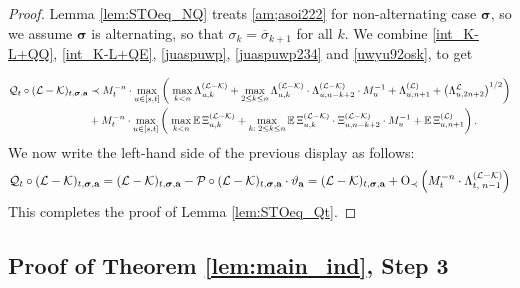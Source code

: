 \begin{proof}
Lemma \ref{lem:STOeq_NQ} treats \eqref{am;asoi222} for non-alternating case $\boldsymbol{\sigma}$, so we assume $\boldsymbol{\sigma}$ is alternating, so that $\sigma_{k}=\overline{\sigma}_{k+1}$ for all $k$. We combine \eqref{int_K-L+QQ}, \eqref{int_K-L+QE}, \eqref{juaspuwp}, \eqref{juaspuwp234} and \eqref{uwyu92osk},  to get

\begin{align}
    {\cal Q}_t\circ   (\mathcal{L} - \mathcal{K})_{t, \boldsymbol{\sigma}, \textbf{a}} &\prec M^{-n}_t\cdot \max_{u\in[s,t]} \left(\; \max_{k<n }\Lambda^{({\cal L-\cal K})}_{u,k}+\max_{2\le k\le n }\Lambda^{({\cal L-\cal K})}_{u,k}\cdot \Lambda^{({\cal L-\cal K})}_{u,n-k+2}\cdot M_{u}^{-1}+\Lambda^{({\cal L})}_{u,n+1}+\left(\Lambda^{\cal L}_{u,2n+2}\right)^{1/2}\right)\nonumber\\
    &+M_{t}^{-n} \cdot \max_{u\in[s,t]}\left(\; \max_{k<n }\mathbb E \,\Xi^{({\cal L-\cal K})}_{u,k}+\max_{k:\;2\le k\le n }\mathbb E \, \Xi^{({\cal L-\cal K})}_{u,k}\cdot \Xi^{({\cal L-\cal K})}_{u,n-k+2}\cdot M_u^{-1}+\mathbb E \,\Xi^{({\cal L})}_{u,n+1}\right).\nonumber
\end{align}
We now write the left-hand side of the previous display as follows:
\begin{align}\label{kolkisaf} 
{\cal Q}_t\circ   (\mathcal{L} - \mathcal{K})_{t, \boldsymbol{\sigma}, \textbf{a}}
 =(\mathcal{L} - \mathcal{K})_{t, \boldsymbol{\sigma}, \textbf{a}}-{\cal P} \circ   (\mathcal{L} - \mathcal{K})_{t, \boldsymbol{\sigma}, \textbf{a}}\cdot \vartheta_{\textbf{a}}
 =(\mathcal{L} - \mathcal{K})_{t, \boldsymbol{\sigma}, \textbf{a}}
 +\mathrm{O}_{\prec} \left(M_t^{-n} \cdot \Lambda^{(\cal L-K)}_{t,\; n-1}\right)
\end{align}
This completes the proof of Lemma \ref{lem:STOeq_Qt}. 
\end{proof}



 
 \subsection{Proof of Theorem \ref{lem:main_ind}, Step 3}

